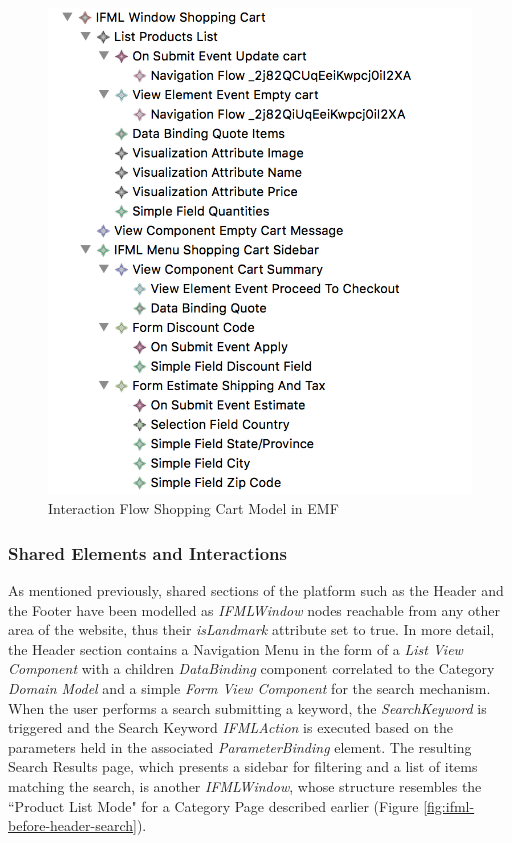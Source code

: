 \vspace{0.5cm}
\begin{figure}[H]
  \centering
    \includegraphics[width=12cm]{images/diagrams/before/ifml-hierarchy-shoppingcart.png}
  \caption{Interaction Flow Shopping Cart Model in EMF}
  \label{fig:ifml-before-hierarchy-shoppingcart}
\end{figure}
\vspace{0.5cm}

\subsubsection{Shared Elements and Interactions}

As mentioned previously, shared sections of the platform such as the Header and the Footer have been modelled as \textit{IFMLWindow} nodes reachable from any other area of the website, thus their \textit{isLandmark} attribute set to true. In more detail, the Header section contains a Navigation Menu in the form of a \textit{List View Component} with a children \textit{DataBinding} component correlated to the Category \textit{Domain Model} and a simple \textit{Form View Component} for the search mechanism. When the user performs a search submitting a keyword, the \textit{SearchKeyword} is triggered and the Search Keyword \textit{IFMLAction} is executed based on the parameters held in the associated \textit{ParameterBinding} element.  The resulting Search Results page, which presents a sidebar for filtering and a list of items matching the search, is another \textit{IFMLWindow}, whose structure resembles the ``Product List Mode" for a Category Page described earlier (Figure \ref{fig:ifml-before-header-search}).

